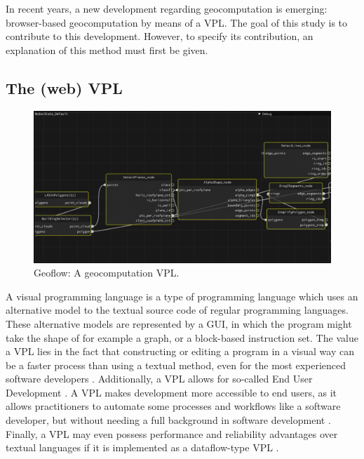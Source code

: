 In recent years, a new development regarding geocomputation is emerging:
browser-based geocomputation by means of a \ac{VPL}.
The goal of this study is to contribute to this development. 
However, to specify its contribution, an explanation of this method must first be given.

\subsection*{The (web) VPL}

\begin{figure}
  \centering
  \graphicspath{{../../assets/images/background/geo-vpl/}}
  \includegraphics[width=\linewidth]{geoflow.png}
  \caption{Geoflow: A geocomputation VPL. \citep{peters_geoflow_2019}}
  \label{fig:1:geoflow}
\end{figure}









A visual programming language is a type of programming language which uses an alternative model to the textual source code of regular programming languages. 
These alternative models are represented by a \ac{GUI}, in which the program might take the shape of for example a graph, or a block-based instruction set.
The value a VPL lies in the fact that constructing or editing a program in a visual way can be a faster process than using a textual method, even for the most experienced software developers \citep{green_usability_1996, kuhail_characterizing_2021}.
Additionally, a \ac{VPL} allows for so-called End User Development \citep{kuhail_characterizing_2021}.
A \ac{VPL} makes development more accessible to end users, as it allows practitioners to automate some processes and workflows like a software developer, but without needing a full background in software development \citep{benac_recent_2022}. 
Finally, a VPL may even possess performance and reliability advantages over textual languages if it is implemented as a dataflow-type VPL \citep{sousa_dataflow_2012}. 

